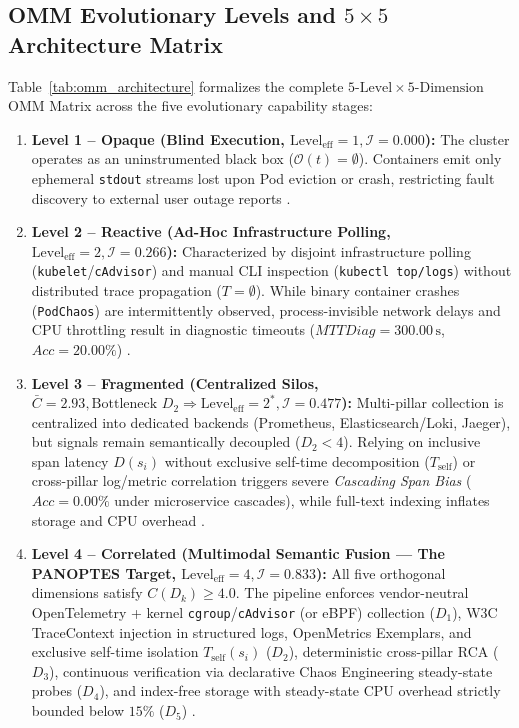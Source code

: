 \subsection{OMM Evolutionary Levels and \texorpdfstring{$5 \times 5$}{5x5} Architecture Matrix}
\label{subsec:omm-matrix}

Table~\ref{tab:omm_architecture} formalizes the complete $5\text{-Level} \times 5\text{-Dimension}$ OMM Matrix across the five evolutionary capability stages:



\begin{enumerate}
    \item \textbf{Level 1 -- Opaque (Blind Execution, $\text{Level}_{\text{eff}} = 1, \mathcal{I} = 0.000$):} The cluster operates as an uninstrumented black box ($\mathcal{O}(t) = \emptyset$). Containers emit only ephemeral \texttt{stdout} streams lost upon Pod eviction or crash, restricting fault discovery to external user outage reports \cite{kosinska_2023, usman_2022}.
    
    \item \textbf{Level 2 -- Reactive (Ad-Hoc Infrastructure Polling, $\text{Level}_{\text{eff}} = 2, \mathcal{I} = 0.266$):} Characterized by disjoint infrastructure polling (\texttt{kubelet}/\texttt{cAdvisor}) and manual CLI inspection (\texttt{kubectl top/logs}) without distributed trace propagation ($T = \emptyset$). While binary container crashes (\texttt{PodChaos}) are intermittently observed, process-invisible network delays and CPU throttling result in diagnostic timeouts ($MTTDiag = 300.00\,\text{s}$, $Acc = 20.00\%$) \cite{zanatta_23, faseeha_2025}.
    
    \item \textbf{Level 3 -- Fragmented (Centralized Silos, $\bar{C} = 2.93, \text{Bottleneck } D_2 \Rightarrow \text{Level}_{\text{eff}} = 2^*, \mathcal{I} = 0.477$):} Multi-pillar collection is centralized into dedicated backends (Prometheus, Elasticsearch/Loki, Jaeger), but signals remain semantically decoupled ($D_2 < 4$). Relying on inclusive span latency $D(s_i)$ without exclusive self-time decomposition ($T_{\text{self}}$) or cross-pillar log/metric correlation triggers severe \textit{Cascading Span Bias} ($Acc = 0.00\%$ under microservice cascades), while full-text indexing inflates storage and CPU overhead \cite{araujo_2024, hartikainen_2024, wei_2025}.
    
    \item \textbf{Level 4 -- Correlated (Multimodal Semantic Fusion --- The PANOPTES Target, $\text{Level}_{\text{eff}} = 4, \mathcal{I} = 0.833$):} All five orthogonal dimensions satisfy $C(D_k) \ge 4.0$. The pipeline enforces vendor-neutral OpenTelemetry + kernel \texttt{cgroup}/\texttt{cAdvisor} (or eBPF) collection ($D_1$), W3C TraceContext injection in structured logs, OpenMetrics Exemplars, and exclusive self-time isolation $T_{\text{self}}(s_i)$ ($D_2$), deterministic cross-pillar RCA ($D_3$), continuous verification via declarative Chaos Engineering steady-state probes ($D_4$), and index-free storage with steady-state CPU overhead strictly bounded below $15\%$ ($D_5$) \cite{faseeha_2025, gomes_2025, hartikainen_2024, kosinska_2023}.
    

\end{enumerate}
